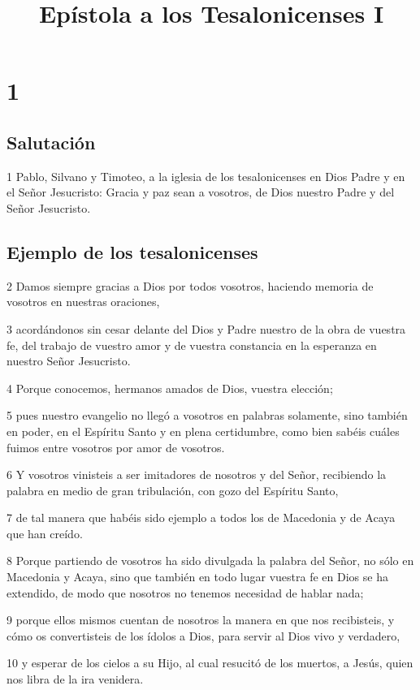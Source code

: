 
\title{Epístola a los Tesalonicenses I}

\chapter{1}

\section*{Salutación}

\par 1 Pablo, Silvano y Timoteo, a la iglesia de los tesalonicenses en Dios Padre y en el Señor Jesucristo: Gracia y paz sean a vosotros, de Dios nuestro Padre y del Señor Jesucristo.

\section*{Ejemplo de los tesalonicenses}

\par 2 Damos siempre gracias a Dios por todos vosotros, haciendo memoria de vosotros en nuestras oraciones,
\par 3 acordándonos sin cesar delante del Dios y Padre nuestro de la obra de vuestra fe, del trabajo de vuestro amor y de vuestra constancia en la esperanza en nuestro Señor Jesucristo.
\par 4 Porque conocemos, hermanos amados de Dios, vuestra elección;
\par 5 pues nuestro evangelio no llegó a vosotros en palabras solamente, sino también en poder, en el Espíritu Santo y en plena certidumbre, como bien sabéis cuáles fuimos entre vosotros por amor de vosotros.
\par 6 Y vosotros vinisteis a ser imitadores de nosotros y del Señor, recibiendo la palabra en medio de gran tribulación, con gozo del Espíritu Santo,
\par 7 de tal manera que habéis sido ejemplo a todos los de Macedonia y de Acaya que han creído.
\par 8 Porque partiendo de vosotros ha sido divulgada la palabra del Señor, no sólo en Macedonia y Acaya, sino que también en todo lugar vuestra fe en Dios se ha extendido, de modo que nosotros no tenemos necesidad de hablar nada;
\par 9 porque ellos mismos cuentan de nosotros la manera en que nos recibisteis, y cómo os convertisteis de los ídolos a Dios, para servir al Dios vivo y verdadero,
\par 10 y esperar de los cielos a su Hijo, al cual resucitó de los muertos, a Jesús, quien nos libra de la ira venidera.


